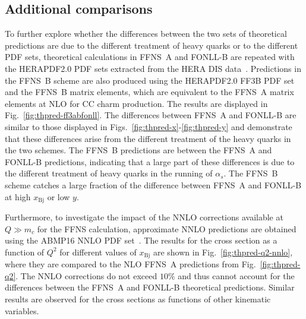 \documentclass[pdftex,twocolumn,epjc3]{svjour3}          %
\newcommand{\abmp} {ABMP16\xspace}
\newcommand{\xbj}{\ensuremath{x_{\text{Bj}}}\xspace}
\newcommand{\fonll} {{FONLL-B}\xspace}
\newcommand{\ffns} {{FFNS~A}\xspace}
\newcommand{\ffnsb} {{FFNS~B}\xspace}
\newcommand{\ffthreeb} {{\hbox{HERAPDF2.0} FF3B}\xspace}
\begin{document}


\subsection{Additional comparisons}
\label{sec:compareII}

To further explore whether the differences between the two sets of
theoretical predictions are due to the different treatment of heavy
quarks or to the different PDF sets, theoretical calculations in \ffns
and \fonll are repeated with the HERAPDF2.0 PDF sets extracted from
the HERA DIS data~\cite{Abramowicz:2015mha}.
%
Predictions in the \ffnsb scheme are also produced using the \ffthreeb
PDF set and the \ffnsb matrix elements, which are equivalent to the
\ffns matrix elements at NLO for CC charm production. The results are
displayed in Fig.~\ref{fig:thpred-ff3abfonll}. The differences between
\ffns and \fonll are similar to those displayed in
Figs.~\ref{fig:thpred-x}-\ref{fig:thpred-y} and demonstrate that these
differences arise from the different treatment of the heavy quarks in
the two schemes. The \ffnsb predictions are between the \ffns and
\fonll predictions, indicating that a large part of these differences
is due to the different treatment of heavy quarks in the running of
$\alpha_s$. The \ffnsb scheme catches a large fraction of the 
difference between \ffns and \fonll at high \xbj or low $y$.


Furthermore, to investigate the impact of the NNLO corrections
available at $Q \gg m_c$ for the FFNS calculation, approximate NNLO
predictions are obtained using the \abmp NNLO PDF
set~\cite{Alekhin:2017kpj}. The results for the cross section as a
function of $Q^2$ for different values of \xbj are shown in
Fig.~\ref{fig:thpred-q2-nnlo}, where they are compared to the NLO
\ffns predictions from Fig.~\ref{fig:thpred-q2}. The NNLO corrections
do not exceed $10\%$ and thus cannot account for the differences
between the \ffns and \fonll theoretical predictions. Similar results
are observed for the cross sections as functions of other kinematic
variables.

\end{document}
